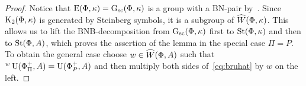 \begin{proof}
    Notice that $\operatorname{E}(\Phi, \kappa) = \operatorname{G}_\mathrm{sc}(\Phi, \kappa)$ is a group with a BN-pair by~\cite[\S~4]{Ge17}.
    Since $\operatorname{K}_2(\Phi, \kappa)$ is generated by Steinberg symbols, it is a subgroup of $\widehat{W}(\Phi, \kappa)$.
    This allows us to lift the BNB-decomposition from $\operatorname{G}_\mathrm{sc}(\Phi, \kappa)$ first to $\operatorname{St}(\Phi, \kappa)$ and then to $\operatorname{St}(\Phi, A)$,
    which proves the assertion of the lemma in the special case $\Pi = P$.
    To obtain the general case choose $w \in \widehat{W}(\Phi, A)$ such that ${}^w \operatorname{U}(\Phi^+_\Pi, A) = \operatorname{U}(\Phi^+_{P}, A)$ and then multiply both sides of~\eqref{eq:bruhat} by $w$ on the left.
    \begin{comment}
    Let us verify the second assertion.
    Projecting the equality~\eqref{eq:bwb-eq} to $\Gsc(\Phi, \kappa)$ and using the fact that double B-cosets are disjoint we obtain that
     $\overline{w} = \overline{w'}$.
    Since $\K_2(\Phi, \kappa)$ is generated by Steinberg symbols, the image of $w^{-1}w'$ in $\St(\Phi, \kappa)$ belongs to $\StH(\Phi, \kappa)$,
     hence
     \begin{multline*} w^{-1}w' \in \left(\StH(\Phi, A) \cdot \overline{\St}(\Phi, A, M)\right) \cdot \StW(\Phi, A) \subseteq \\ \subseteq
      \left( \UU(\Phi^+, M) \cdot \StH(\Phi, A) \cdot \UU(\Phi^-, M)\right) \cap \StW(\Phi, A) \subseteq \StH(\Phi, A). \end{multline*}
    Here the first inclusion follows from~\cite[Theorem~2.4]{Ste73} and the second inclusion is clear from consideration of matrices.

     \[w^{-1} w' \in \bigl(\StH(\Phi, A) \cdot \overline{\St}(\Phi, A, M)\bigr)\cap \StW(\Phi, A) \subseteq \StH(\Phi, A).\]
    Here we use the fact that $\K_2(\Phi, A)$ is generated by Steinberg symbols, see e.\,g.~\cite[Theorem~2.5]{Ste73}.
    \end{comment}
\end{proof}

